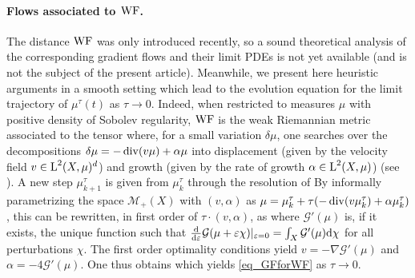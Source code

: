 \paragraph{Flows associated to $\operatorname{WF}$.}
The distance $\operatorname{WF}$ was only introduced recently, so a sound theoretical analysis of the corresponding gradient flows and their limit PDEs is not yet available (and is not the subject of the present article). Meanwhile, we present here heuristic arguments in a smooth setting which lead to the evolution equation
for the limit trajectory of $\mu^\tau(t)$ as $\tau \rightarrow 0$.
Indeed, when restricted to measures $\mu$ with positive density of Sobolev regularity, $\operatorname{WF}$ is the weak Riemannian metric associated to the tensor
where, for a small variation $\delta \mu$, one searches over the decompositions $\delta \mu = -\operatorname{div}(v\mu) + \alpha \mu$ into displacement (given by the velocity field $v\in \text{\upshape L}^2(X,\mu)^d$) and growth (given by the rate of growth $\alpha\in \text{\upshape L}^2(X,\mu)$) (see \cite{2015-chizat-unbalanced}).
%
A new step $\mu_{k+1}^\tau$ is given from $\mu^\tau_k$ through the resolution of
By informally parametrizing the space $\mathcal{M}_+(X)$ with $(v,\alpha)$ as $\mu = \mu^\tau_k +\tau (-\operatorname{div} (v\mu^\tau_k) + \alpha \mu_k^\tau)$, this can be rewritten, in first order of $\tau \cdot (v,\alpha)$, as
where $\mathcal{G}'(\mu)$ is, if it exists, the unique function such that $\frac{\mathrm{d} }{\mathrm{d} \varepsilon} \mathcal{G}(\mu + \varepsilon \chi)\vert_{\varepsilon=0} = \int_X \mathcal{G}'(\mu) \mathrm{d} \chi$ for all perturbations $\chi$. 
The first order optimality conditions yield $v = -\nabla \mathcal{G}'(\mu)$ and $\alpha = -4\mathcal{G}'(\mu)$. One thus obtains
which yields \eqref{eq_GFforWF} as $\tau \to 0$.



